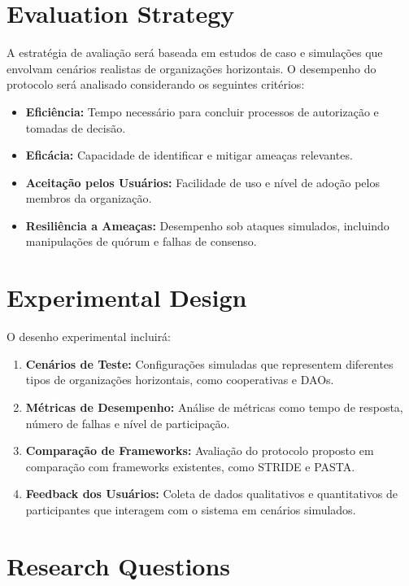 \section{Evaluation Strategy}
\label{sec:evaluation_strategy}

A estratégia de avaliação será baseada em estudos de caso e simulações
que envolvam cenários realistas de organizações horizontais. O
desempenho do protocolo será analisado considerando os seguintes
critérios:

\begin{itemize}
    \item \textbf{Eficiência:} Tempo necessário para concluir
processos de autorização e tomadas de decisão.
    \item \textbf{Eficácia:} Capacidade de identificar e mitigar
ameaças relevantes.
    \item \textbf{Aceitação pelos Usuários:} Facilidade de uso e nível
de adoção pelos membros da organização.
    \item \textbf{Resiliência a Ameaças:} Desempenho sob ataques
simulados, incluindo manipulações de quórum e falhas de consenso.
\end{itemize}

\section{Experimental Design}
\label{sec:experimental_design}

O desenho experimental incluirá:

\begin{enumerate}
    \item \textbf{Cenários de Teste:} Configurações simuladas que
representem diferentes tipos de organizações horizontais, como
cooperativas e DAOs.
    \item \textbf{Métricas de Desempenho:} Análise de métricas como
tempo de resposta, número de falhas e nível de participação.
    \item \textbf{Comparação de Frameworks:} Avaliação do protocolo
proposto em comparação com frameworks existentes, como STRIDE e PASTA.
    \item \textbf{Feedback dos Usuários:} Coleta de dados qualitativos
e quantitativos de participantes que interagem com o sistema em
cenários simulados.
\end{enumerate}

\section{Research Questions}
\label{sec:research_questions}

